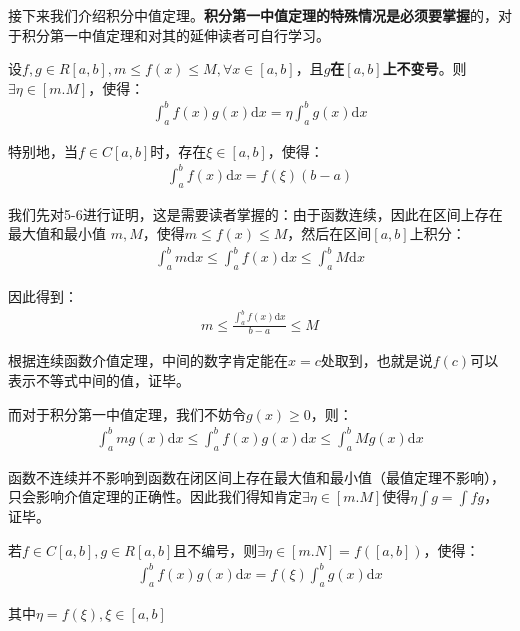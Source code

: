 \documentclass{ctexart}
\let\oldtextbf\textbf %
\renewcommand{\textbf}[1]{\textcolor{btex}{\oldtextbf{#1}}} %
\begin{document}
接下来我们介绍积分中值定理。\textbf{积分第一中值定理的特殊情况是必须要掌握}的，对于积分第一中值定理和对其的延伸读者可自行学习。
\begin{tcolorbox}[
    colback=bac1,     %
    colframe=fra1,   %
    coltitle=white,             %
    coltext=tex1,
    title=积分第一中值定理,
    fonttitle=\bfseries,        %
arc=3mm,                     %
breakable
]
设$f,g\in R[a,b],m\leq f(x)\leq M,\forall x\in[a,b]$，且\textbf{$g$在$[a,b]$上不变号}。则$\exists \eta\in [m.M]$，使得：
\begin{align*}
    \int_a^b f(x)g(x)\mathrm{d}x=\eta \int_a^b g(x)\mathrm{d}x\tag{5-5}
\end{align*}

特别地，当$f\in C[a,b]$时，存在$\xi\in[a,b]$，使得：
\begin{align*}
    \int_a^b f(x)\mathrm{d}x=f(\xi)(b-a)\tag{5-6}
\end{align*}
\end{tcolorbox}

我们先对5-6进行证明，这是需要读者掌握的：由于函数连续，因此在区间上存在最大值和最小值
$m,M$，使得$m\leq f(x)\leq M$，然后在区间$[a,b]$上积分：
\begin{align*}
  \int_a^b m\mathrm{d}x \leq  \int_a^b f(x)\mathrm{d}x\leq \int_a^b M\mathrm{d}x
\end{align*}

因此得到：
\begin{align*}
    m\leq\frac{\int_a^b f(x)\mathrm{d}x}{b-a}\leq M
\end{align*}

根据连续函数介值定理，中间的数字肯定能在$x=c$处取到，也就是说$f(c)$可以表示不等式中间的值，证毕。

而对于积分第一中值定理，我们不妨令$g(x)\geq 0$，则：
\begin{align*}
    \int_a^b mg(x)\mathrm{d}x\leq \int_a^b f(x)g(x)\mathrm{d}x\leq \int _a^b Mg(x)\mathrm{d}x
\end{align*}

函数不连续并不影响到函数在闭区间上存在最大值和最小值（最值定理不影响），只会影响介值定理的正确性。因此我们得知肯定$\exists \eta\in[m.M]$使得$\eta\int g=\int fg$，证毕。

\begin{tcolorbox}[
    colback=bac1,     %
    colframe=fra1,   %
    coltitle=white,             %
    coltext=tex1,
    title=积分第一中值定理拓展,
    fonttitle=\bfseries,        %
arc=3mm,                     %
breakable
]

若$f\in C[a,b],g\in R[a,b]$且不编号，则$\exists\eta\in[m.N]=f([a,b])$，使得：
\begin{align*}
    \int_a^b f(x)g(x)\mathrm{d}x=f(\xi)\int_a^b g(x)\mathrm{d}x\tag{5-7}
\end{align*}

其中$\eta=f(\xi),\xi\in[a,b]$
\end{tcolorbox}
\end{document}
